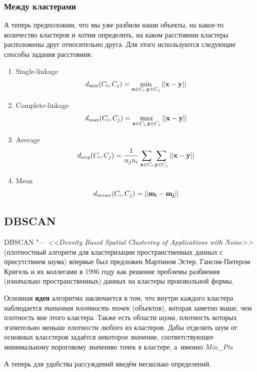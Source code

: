 \subsubsection{Между кластерами}
А теперь предположим, что мы уже разбили наши объекты, на какое-то количество кластеров и хотим определить, на каком расстоянии кластеры расположены друг относительно друга.
Для этого используются следующие способы задания расстояния:
\begin{enumerate}
\item Single-linkage
\[
d_{\min} (C_i,C_j) = \min\limits_{{\bf x} \in C_i, {\bf y} \in C_j} ||{\bf x} - {\bf y}||
\]
\item Complete-linkage
\[
d_{\max} (C_i,C_j) = \max\limits_{{\bf x} \in C_i, {\bf y} \in C_j} ||{\bf x} - {\bf y}||
\]
\item Average
\[
d_{avg} (C_i,C_j) = \frac{1}{n_j n_i} \sum\limits_{{\bf x} \in C_i}  \sum\limits_{{\bf y} \in C_j} ||{\bf x} - {\bf y}||
\]
\item Mean
\[
d_{mean} (C_i,C_j) = ||{\bf m_i} - {\bf m_j}||
\]
\end{enumerate}
\newpage

\newpage

\subsection{DBSCAN}
DBSCAN "--- {\it <<Density Based Spatial Clustering of Applications with Noise>>} (плотностный алгоритм для кластеризации пространственных данных с присутствием шума) впервые был предложен Мартином Эстер, Гансом-Питером Кригель и их коллегами в 1996 году как решение проблемы разбиения (изначально пространственных) данных на кластеры произвольной формы.

Основная {\bf идея} алгоритма заключается в том, что внутри каждого кластера наблюдается {\it типичная плотность точек} (объектов), которая заметно выше, чем плотность вне этого кластера. Также есть области {\it шума}, плотность которых згачительно меньше плотности любого из кластеров. Дабы отделить шум от основных класстеров задаётся некоторое значение, соответствующее минимальному пороговому значению точек в кластере, а~именно {\it Min\_Pts}

А теперь для удобства рассуждений введём несколько определений.

